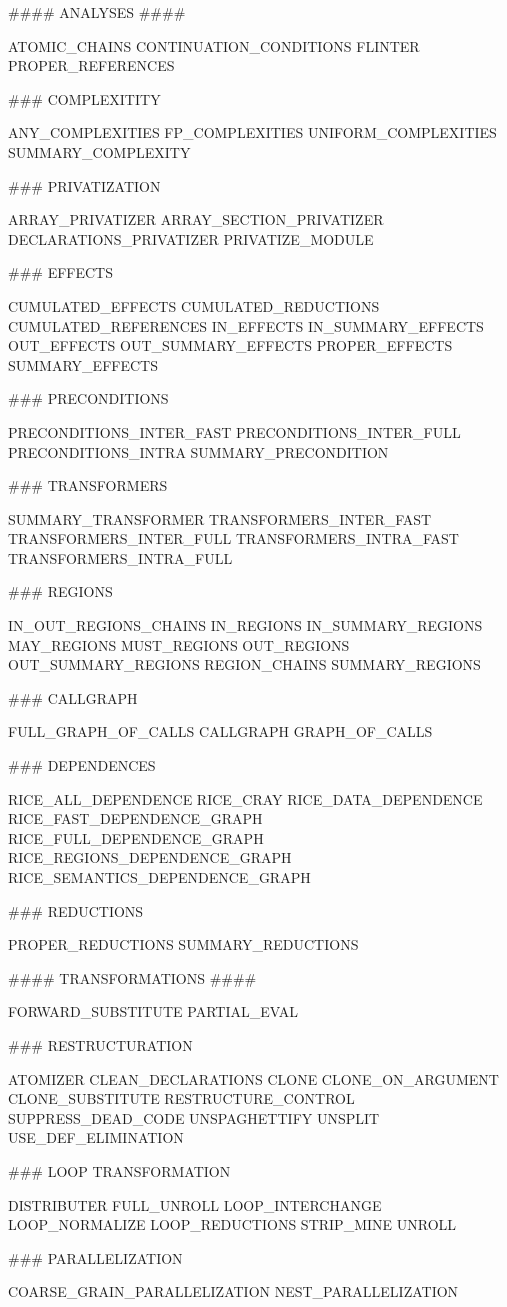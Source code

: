 \documentclass[a4paper,12pt]{article}
\begin{document}
\begin{verbatim*}
#### ANALYSES ####

ATOMIC_CHAINS                    
CONTINUATION_CONDITIONS  
FLINTER  
PROPER_REFERENCES

### COMPLEXITITY 

ANY_COMPLEXITIES  
FP_COMPLEXITIES  
UNIFORM_COMPLEXITIES
SUMMARY_COMPLEXITY

### PRIVATIZATION

ARRAY_PRIVATIZER  
ARRAY_SECTION_PRIVATIZER  
DECLARATIONS_PRIVATIZER 
PRIVATIZE_MODULE

### EFFECTS

CUMULATED_EFFECTS  
CUMULATED_REDUCTIONS  
CUMULATED_REFERENCES  
IN_EFFECTS 
IN_SUMMARY_EFFECTS 
OUT_EFFECTS  
OUT_SUMMARY_EFFECTS  
PROPER_EFFECTS
SUMMARY_EFFECTS


### PRECONDITIONS

PRECONDITIONS_INTER_FAST  
PRECONDITIONS_INTER_FULL  
PRECONDITIONS_INTRA  
SUMMARY_PRECONDITION


### TRANSFORMERS

SUMMARY_TRANSFORMER
TRANSFORMERS_INTER_FAST
TRANSFORMERS_INTER_FULL
TRANSFORMERS_INTRA_FAST
TRANSFORMERS_INTRA_FULL


### REGIONS 

IN_OUT_REGIONS_CHAINS  
IN_REGIONS 
IN_SUMMARY_REGIONS 
MAY_REGIONS 
MUST_REGIONS
OUT_REGIONS  
OUT_SUMMARY_REGIONS  
REGION_CHAINS
SUMMARY_REGIONS

### CALLGRAPH 

FULL_GRAPH_OF_CALLS  
CALLGRAPH  
GRAPH_OF_CALLS 

### DEPENDENCES

RICE_ALL_DEPENDENCE
RICE_CRAY
RICE_DATA_DEPENDENCE
RICE_FAST_DEPENDENCE_GRAPH
RICE_FULL_DEPENDENCE_GRAPH
RICE_REGIONS_DEPENDENCE_GRAPH
RICE_SEMANTICS_DEPENDENCE_GRAPH

### REDUCTIONS

PROPER_REDUCTIONS
SUMMARY_REDUCTIONS


#### TRANSFORMATIONS #### 

FORWARD_SUBSTITUTE            
PARTIAL_EVAL 

### RESTRUCTURATION 

ATOMIZER  
CLEAN_DECLARATIONS  
CLONE  
CLONE_ON_ARGUMENT  
CLONE_SUBSTITUTE  
RESTRUCTURE_CONTROL
SUPPRESS_DEAD_CODE
UNSPAGHETTIFY
UNSPLIT
USE_DEF_ELIMINATION

### LOOP TRANSFORMATION

DISTRIBUTER  
FULL_UNROLL 
LOOP_INTERCHANGE  
LOOP_NORMALIZE  
LOOP_REDUCTIONS  
STRIP_MINE
UNROLL

### PARALLELIZATION

COARSE_GRAIN_PARALLELIZATION  
NEST_PARALLELIZATION 
\end{verbatim*}
\end{document}
